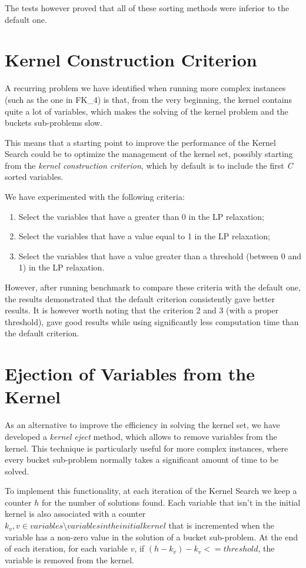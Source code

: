 The tests however proved that all of these sorting methods were inferior to the
default one.


\section{Kernel Construction Criterion}
A recurring problem we have identified when running more complex
instances (such as the one in FK\_4) is that,
from the very beginning, the kernel contains quite a lot of variables,
which makes the solving of the kernel problem and the buckets sub-problems slow.

This means that a starting point to improve the performance of the Kernel Search
could be to optimize the management of the kernel set,
possibly starting from the \textit{kernel construction criterion},
which by default is to include the first \textit{C} sorted variables.

We have experimented with the following criteria:
\begin{enumerate}
    \item Select the variables that have a greater than 0 in the LP relaxation;
    \item Select the variables that have a value equal to 1 in the LP relaxation;
    \item Select the variables that have a value greater than a threshold
    (between 0 and 1) in the LP relaxation.
\end{enumerate}

However, after running benchmark to compare these criteria
with the default one, the results demonstrated that the default criterion
consistently gave better results.
It is however worth noting that the criterion 2 and 3 (with a proper threshold),
gave good results while using significantly less computation time than the default criterion.


\section{Ejection of Variables from the Kernel}
As an alternative to improve the efficiency in solving the kernel set,
we have developed a \textit{kernel eject} method, which allows to remove variables from the kernel.
This technique is particularly useful for more complex instances, where every
bucket sub-problem normally takes a significant amount of time to be solved.

To implement this functionality, at each iteration of the Kernel Search
we keep a counter \(h\) for the number of solutions found.
Each variable that isn't in the initial kernel
is also associated with a counter \(k_{v}, v \in variables \setminus variables in the initial kernel\)
that is incremented when the variable has a non-zero value in the solution of a bucket sub-problem.
At the end of each iteration, for each variable \(v\), if
\((h - k_{v}) - k_{v} <= threshold\), the variable is removed from the kernel.

